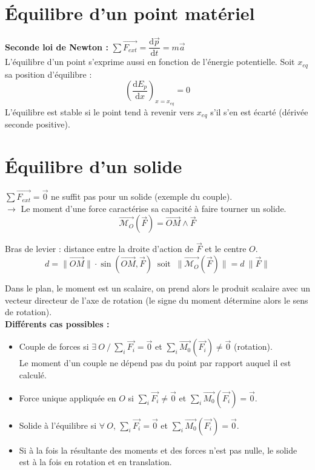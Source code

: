 \documentclass[13pt, twoside, a4paper, french]{report}
\begin{document}
  
  \section{Équilibre d'un point matériel}\label{sec:equilibre-d'un-point-materiel}
    
    \textbf{Seconde loi de Newton : } $\sum \overrightarrow{F_{ext}} = \dfrac{\textrm{d}\vec{p}}{\textrm{d}t} = m \vec{a}$\\
    L'équilibre d'un point s'exprime aussi en fonction de l'énergie potentielle.
    Soit $x_{eq}$ sa position d'équilibre :
    \[ \left( \dfrac{\textrm{d}E_p}{\textrm{d}x}\right) _{x=x_{eq}} = 0\]
    L'équilibre est stable si le point tend à revenir vers $x_{eq}$ s'il s'en est écarté (dérivée seconde positive).
  
  
  \section{Équilibre d'un solide}\label{sec:equilibre-d-un-solide}
    
    $\sum \overrightarrow{F_{ext}} = \vec{0}$ ne suffit pas pour un solide (exemple du couple).\\
    $\rightarrow$ Le moment d'une force caractérise sa capacité à faire tourner un solide.
    \[ \overrightarrow{\mathcal{M}_O}(\overrightarrow{F}) = \overrightarrow{OM} \land \overrightarrow{F} \]
    
    Bras de levier : distance entre la droite d'action de $\overrightarrow{F}$ et le centre $O$.
    \[ d = \|\overrightarrow{OM}\| \cdot \sin(\overrightarrow{OM}, \overrightarrow{F}) \;\; \text{soit} \;\; \|\overrightarrow{\mathcal{M}_O}(\overrightarrow{F})\| = d\ \|\overrightarrow{F}\| \]
    
    Dans le plan, le moment est un scalaire, on prend alors le produit scalaire avec un vecteur directeur de l'axe de rotation (le signe du moment détermine alors le sens de rotation).\\
    
    \textbf{Différents cas possibles :}
    \begin{itemize}
      \item Couple de forces si $\exists\ O\ /\ \sum_i \overrightarrow{F_i} = \vec 0$ et $\sum_i \overrightarrow{M_0}(\overrightarrow{F_i}) \neq \vec 0$ (rotation).\\Le moment d’un couple ne dépend pas du point par rapport auquel il est calculé.
      \item Force unique appliquée en $O$ si $\sum_i \overrightarrow{F_i} \neq \vec 0$ et $\sum_i \overrightarrow{M_0}(\overrightarrow{F_i}) = \vec 0$.
      \item Solide à l'équilibre si $\forall\ O$, $\sum_i \overrightarrow{F_i} = \vec 0$ et $\sum_i \overrightarrow{M_0}(\overrightarrow{F_i}) = \vec 0$.
      \item Si à la fois la résultante des moments et des forces n'est pas nulle, le solide est à la fois en rotation et en translation.
    \end{itemize}
\end{document}
